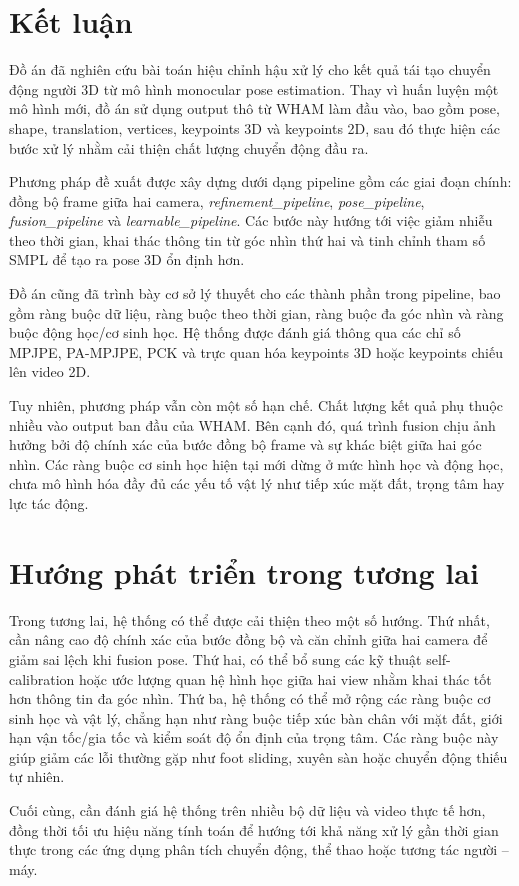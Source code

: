 \documentclass[../DoAn.tex]{subfiles}
\begin{document}
\section{Kết luận}

Đồ án đã nghiên cứu bài toán hiệu chỉnh hậu xử lý cho kết quả tái tạo chuyển động người 3D từ mô hình monocular pose estimation. Thay vì huấn luyện một mô hình mới, đồ án sử dụng output thô từ WHAM làm đầu vào, bao gồm pose, shape, translation, vertices, keypoints 3D và keypoints 2D, sau đó thực hiện các bước xử lý nhằm cải thiện chất lượng chuyển động đầu ra.

Phương pháp đề xuất được xây dựng dưới dạng pipeline gồm các giai đoạn chính: đồng bộ frame giữa hai camera, \textit{refinement\_pipeline}, \textit{pose\_pipeline}, \textit{fusion\_pipeline} và \textit{learnable\_pipeline}. Các bước này hướng tới việc giảm nhiễu theo thời gian, khai thác thông tin từ góc nhìn thứ hai và tinh chỉnh tham số SMPL để tạo ra pose 3D ổn định hơn.

Đồ án cũng đã trình bày cơ sở lý thuyết cho các thành phần trong pipeline, bao gồm ràng buộc dữ liệu, ràng buộc theo thời gian, ràng buộc đa góc nhìn và ràng buộc động học/cơ sinh học. Hệ thống được đánh giá thông qua các chỉ số MPJPE, PA-MPJPE, PCK và trực quan hóa keypoints 3D hoặc keypoints chiếu lên video 2D.

Tuy nhiên, phương pháp vẫn còn một số hạn chế. Chất lượng kết quả phụ thuộc nhiều vào output ban đầu của WHAM. Bên cạnh đó, quá trình fusion chịu ảnh hưởng bởi độ chính xác của bước đồng bộ frame và sự khác biệt giữa hai góc nhìn. Các ràng buộc cơ sinh học hiện tại mới dừng ở mức hình học và động học, chưa mô hình hóa đầy đủ các yếu tố vật lý như tiếp xúc mặt đất, trọng tâm hay lực tác động.

\section{Hướng phát triển trong tương lai}

Trong tương lai, hệ thống có thể được cải thiện theo một số hướng. Thứ nhất, cần nâng cao độ chính xác của bước đồng bộ và căn chỉnh giữa hai camera để giảm sai lệch khi fusion pose. Thứ hai, có thể bổ sung các kỹ thuật self-calibration hoặc ước lượng quan hệ hình học giữa hai view nhằm khai thác tốt hơn thông tin đa góc nhìn. Thứ ba, hệ thống có thể mở rộng các ràng buộc cơ sinh học và vật lý, chẳng hạn như ràng buộc tiếp xúc bàn chân với mặt đất, giới hạn vận tốc/gia tốc và kiểm soát độ ổn định của trọng tâm. Các ràng buộc này giúp giảm các lỗi thường gặp như foot sliding, xuyên sàn hoặc chuyển động thiếu tự nhiên.

Cuối cùng, cần đánh giá hệ thống trên nhiều bộ dữ liệu và video thực tế hơn, đồng thời tối ưu hiệu năng tính toán để hướng tới khả năng xử lý gần thời gian thực trong các ứng dụng phân tích chuyển động, thể thao hoặc tương tác người -- máy.
\end{document}
